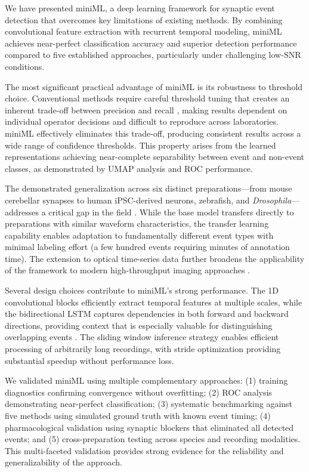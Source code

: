 \documentclass[11pt]{article}
\begin{document}
We have presented miniML, a deep learning framework for synaptic event detection that overcomes key limitations of existing methods. By combining convolutional feature extraction with recurrent temporal modeling, miniML achieves near-perfect classification accuracy and superior detection performance compared to five established approaches, particularly under challenging low-SNR conditions.

The most significant practical advantage of miniML is its robustness to threshold choice. Conventional methods require careful threshold tuning that creates an inherent trade-off between precision and recall \citep{Bhatt2012,Bhatt2014}, making results dependent on individual operator decisions and difficult to reproduce across laboratories. miniML effectively eliminates this trade-off, producing consistent results across a wide range of confidence thresholds. This property arises from the learned representations achieving near-complete separability between event and non-event classes, as demonstrated by UMAP analysis and ROC performance.

The demonstrated generalization across six distinct preparations---from mouse cerebellar synapses to human iPSC-derived neurons, zebrafish, and \textit{Drosophila}---addresses a critical gap in the field \citep{LeCun2015}. While the base model transfers directly to preparations with similar waveform characteristics, the transfer learning capability enables adaptation to fundamentally different event types with minimal labeling effort (a few hundred events requiring minutes of annotation time). The extension to optical time-series data further broadens the applicability of the framework to modern high-throughput imaging approaches \citep{Bhatt2022,Bhatt2023}.

Several design choices contribute to miniML's strong performance. The 1D convolutional blocks efficiently extract temporal features at multiple scales, while the bidirectional LSTM captures dependencies in both forward and backward directions, providing context that is especially valuable for distinguishing overlapping events \citep{Hochreiter1997,Graves2013}. The sliding window inference strategy enables efficient processing of arbitrarily long recordings, with stride optimization providing substantial speedup without performance loss.

We validated miniML using multiple complementary approaches: (1) training diagnostics confirming convergence without overfitting; (2) ROC analysis demonstrating near-perfect classification; (3) systematic benchmarking against five methods using simulated ground truth with known event timing; (4) pharmacological validation using synaptic blockers that eliminated all detected events; and (5) cross-preparation testing across species and recording modalities. This multi-faceted validation provides strong evidence for the reliability and generalizability of the approach.
\end{document}
